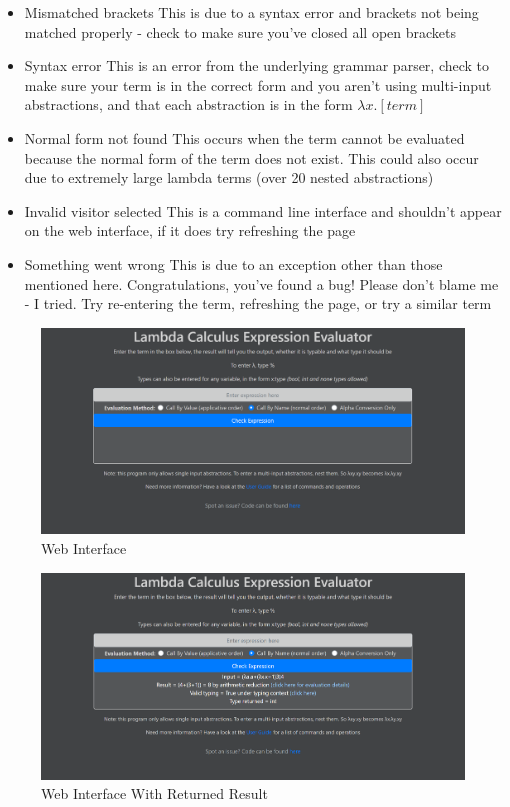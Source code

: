 \documentclass[a4paper,11pt]{article}
\begin{document}
\begin{itemize}
	\item Mismatched brackets
	\subitem This is due to a syntax error and brackets not being matched properly - check to make sure you've closed all open brackets
	\item Syntax error
	\subitem This is an error from the underlying grammar parser, check to make sure your term is in the correct form and you aren't using multi-input abstractions, and that each abstraction is in the form $\lambda x.[term]$
	\item Normal form not found
	\subitem This occurs when the term cannot be evaluated because the normal form of the term does not exist. This could also occur due to extremely large lambda terms (over 20 nested abstractions)
	\item Invalid visitor selected
	\subitem This is a command line interface and shouldn't appear on the web interface, if it does try refreshing the page
	\item Something went wrong
	\subitem This is due to an exception other than those mentioned here. Congratulations, you've found a bug! Please don't blame me - I tried. Try re-entering the term, refreshing the page, or try a similar term
\end{itemize}

\begin{figure}[p]
	\includegraphics[scale=0.4]{images/web_interface_no_input}
	\centering
	\caption{Web Interface}
	\label{web_interface_no_input}
\end{figure}

\begin{figure}[p]
	\centering
	\includegraphics[scale=0.4]{images/web_interface_input}
	\caption{Web Interface With Returned Result}
	\label{web_interface_input}
\end{figure}
\end{document}
